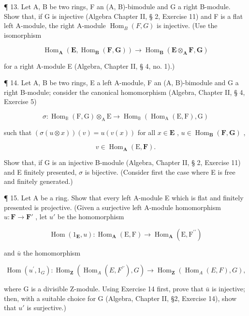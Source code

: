 ¶ 13. Let A, B be two rings, F an (A, B)-bimodule and G a right B-module. Show that, if G is injective (Algebra Chapter II, § 2, Exercise 11) and F is a flat left A-module, the right A-module \(\operatorname{Hom}_{B}(F, G)\) is injective. (Use the isomorphism

\[
\operatorname{Hom} _ {\mathbf {A}} (\mathbf {E}, \operatorname{Hom} _ {\mathbf {B}} (\mathbf {F}, \mathbf {G})) \rightarrow \operatorname{Hom} _ {\mathbf {B}} (\mathbf {E} \otimes_ {\mathbf {A}} \mathbf {F}, \mathbf {G})
\]

for a right A-module E (Algebra, Chapter II, § 4, no. 1).)

¶ 14. Let A, B be two rings, E a left A-module, F an (A, B)-bimodule and G a right B-module; consider the canonical homomorphism (Algebra, Chapter II, § 4, Exercise 5)

\[
\sigma \colon \operatorname{Hom} _ {\mathbb {B}} (\mathrm{F}, \mathrm{G}) \otimes_ {\mathrm{A}} \mathrm{E} \rightarrow \operatorname{Hom} _ {\mathbb {B}} (\operatorname{Hom} _ {\mathrm{A}} (\mathrm{E}, \mathrm{F}), \mathrm{G})
\]

such that \((\sigma(u \otimes x))(v) = u(v(x))\) for all \(x \in \mathbf{E}\) , \(u \in \operatorname{Hom}_{\mathbf{B}}(\mathbf{F}, \mathbf{G})\) ,

\[
v \in \operatorname{Hom} _ {\mathbf {A}} (\mathrm{E}, \mathbf {F}).
\]

Show that, if G is an injective B-module (Algebra, Chapter II, § 2, Exercise 11) and E finitely presented, \(\sigma\) is bijective. (Consider first the case where E is free and finitely generated.)

¶ 15. Let A be a ring. Show that every left A-module E which is flat and finitely presented is projective. (Given a surjective left A-module homomorphism \(u: \mathbf{F} \to \mathbf{F}'\) , let \(u'\) be the homomorphism

\[
\operatorname{Hom} \left(1 _ {\mathbf {E}}, u\right): \operatorname{Hom} _ {\mathbf {A}} (\mathrm{E}, \mathrm{F}) \rightarrow \operatorname{Hom} _ {\mathbf {A}} (\mathrm{E}, \mathrm{F} ^ {\prime \prime})
\]

and \(\bar{u}\) the homomorphism

\[
\operatorname{Hom} \left(u ^ {\prime}, 1 _ {G}\right): \operatorname{Hom} _ {\mathbf {Z}} \left(\operatorname{Hom} _ {A} (E, F ^ {\prime \prime}), G\right)\rightarrow \operatorname{Hom} _ {\mathbf {Z}} \left(\operatorname{Hom} _ {A} (E, F), G\right),
\]

where G is a divisible Z-module. Using Exercise 14 first, prove that \(\bar{u}\) is injective; then, with a suitable choice for G (Algebra, Chapter II, §2, Exercise 14), show that \(u'\) is surjective.)

